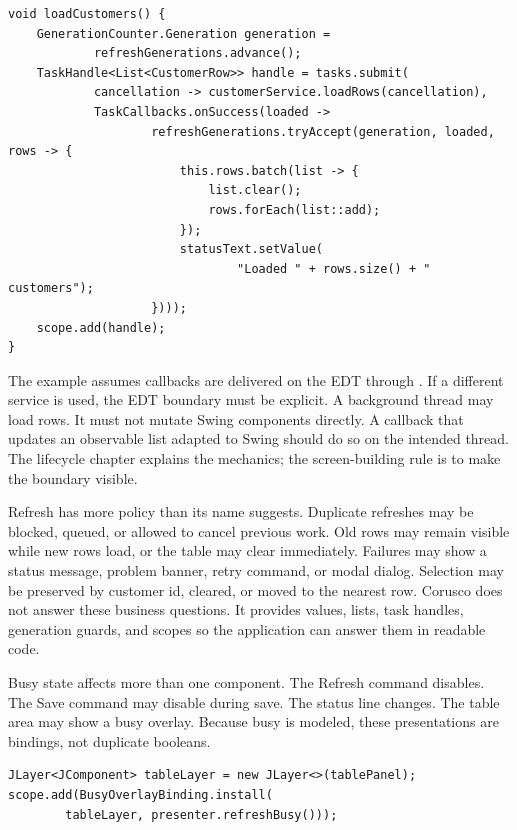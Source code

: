 \begin{lstlisting}[caption={Refresh as task-owned workflow.}]
void loadCustomers() {
    GenerationCounter.Generation generation =
            refreshGenerations.advance();
    TaskHandle<List<CustomerRow>> handle = tasks.submit(
            cancellation -> customerService.loadRows(cancellation),
            TaskCallbacks.onSuccess(loaded ->
                    refreshGenerations.tryAccept(generation, loaded, rows -> {
                        this.rows.batch(list -> {
                            list.clear();
                            rows.forEach(list::add);
                        });
                        statusText.setValue(
                                "Loaded " + rows.size() + " customers");
                    })));
    scope.add(handle);
}
\end{lstlisting}

The example assumes callbacks are delivered on the EDT through
. If a different service is used, the EDT boundary must
be explicit. A background thread may load rows. It must not mutate Swing
components directly. A callback that updates an observable list adapted to
Swing should do so on the intended thread. The lifecycle chapter explains the
mechanics; the screen-building rule is to make the boundary visible.

Refresh has more policy than its name suggests. Duplicate refreshes may be
blocked, queued, or allowed to cancel previous work. Old rows may remain
visible while new rows load, or the table may clear immediately. Failures may
show a status message, problem banner, retry command, or modal dialog.
Selection may be preserved by customer id, cleared, or moved to the nearest
row. Corusco does not answer these business questions. It provides values,
lists, task handles, generation guards, and scopes so the application can
answer them in readable code.

Busy state affects more than one component. The Refresh command disables. The
Save command may disable during save. The status line changes. The table area
may show a busy overlay. Because busy is modeled, these presentations are
bindings, not duplicate booleans.

\begin{lstlisting}[caption={Busy overlay in the workspace view.}]
JLayer<JComponent> tableLayer = new JLayer<>(tablePanel);
scope.add(BusyOverlayBinding.install(
        tableLayer, presenter.refreshBusy()));
\end{lstlisting}


